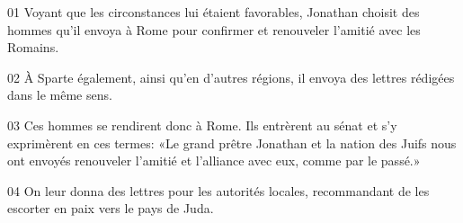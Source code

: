 01 Voyant que les circonstances lui étaient favorables, Jonathan choisit des hommes qu’il envoya à Rome pour confirmer et renouveler l’amitié avec les Romains.

02 À Sparte également, ainsi qu’en d’autres régions, il envoya des lettres rédigées dans le même sens.

03 Ces hommes se rendirent donc à Rome. Ils entrèrent au sénat et s’y exprimèrent en ces termes: «Le grand prêtre Jonathan et la nation des Juifs nous ont envoyés renouveler l’amitié et l’alliance avec eux, comme par le passé.»

04 On leur donna des lettres pour les autorités locales, recommandant de les escorter en paix vers le pays de Juda.
